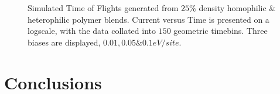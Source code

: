 \documentclass[twocolumn,a4,notitlepage]{article}
\begin{document}
\begin{figure}[htb]
\centering
{}
\caption{Simulated Time of Flights generated from $25\%$ density homophilic
\& heterophilic polymer blends. Current versus Time is presented on a
logscale, with the data collated into $150$ geometric timebins. Three biases
are displayed, $0.01, 0.05 \& 0.1 eV/site$. 
}
\label{tofs}
\end{figure}

\section{Conclusions}
\end{document}
